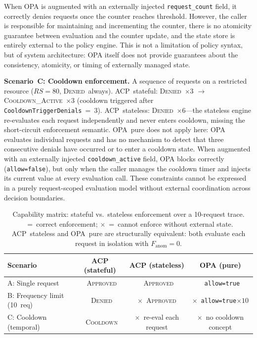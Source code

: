 \documentclass[11pt]{article}
\theoremstyle{definition}
\newcommand{\yes}{\checkmark}
\newcommand{\no}{$\times$}
\begin{document}
When OPA is augmented with an externally injected \texttt{request\_count} field,
it correctly denies requests once the counter reaches threshold.
However, the caller is responsible for maintaining and incrementing the counter,
there is no atomicity guarantee between evaluation and the counter update, and
the state store is entirely external to the policy engine.
This is not a limitation of policy syntax, but of system architecture: OPA itself does
not provide guarantees about the consistency, atomicity, or timing of externally
managed state.

\textbf{Scenario~C: Cooldown enforcement.}
A sequence of requests on a restricted resource ($RS=80$, \textsc{Denied}~always).
ACP~stateful: \textsc{Denied}~$\times 3$ $\to$ \textsc{Cooldown\_Active}~$\times 3$
(cooldown triggered after \texttt{CooldownTriggerDenials}~=~3).
ACP~stateless: \textsc{Denied}~$\times 6$---the stateless engine re-evaluates each
request independently and never enters cooldown, missing the short-circuit
enforcement semantic.
OPA~pure does not apply here: OPA evaluates individual requests and has no mechanism
to detect that three consecutive denials have occurred or to enter a cooldown state.
When augmented with an externally injected \texttt{cooldown\_active} field, OPA blocks
correctly (\texttt{allow=false}), but only when the caller manages the cooldown timer
and injects its current value at every evaluation call.
These constraints cannot be expressed in a purely request-scoped evaluation model
without external coordination across decision boundaries.

\begin{table}[h]
\centering
\small
\begin{tabular}{@{}lccc@{}}
\toprule
\textbf{Scenario} & \textbf{ACP (stateful)} & \textbf{ACP (stateless)} & \textbf{OPA (pure)} \\
\midrule
A: Single request           & \yes~\textsc{Approved}  & \yes~\textsc{Approved}    & \yes~\texttt{allow=true} \\
B: Frequency limit (10~req) & \yes~\textsc{Denied}    & \no~\textsc{Approved}     & \no~\texttt{allow=true}$\times 10$  \\
C: Cooldown (temporal)      & \yes~\textsc{Cooldown}  & \no~re-eval each request  & \no~no cooldown concept \\
\bottomrule
\end{tabular}
\caption{Capability matrix: stateful vs.\ stateless enforcement over a 10-request trace.
\yes~=~correct enforcement; \no~=~cannot enforce without external state.
ACP~stateless and OPA~pure are structurally equivalent: both evaluate each request
in isolation with $F_{\mathrm{anom}}=0$.}
\label{tab:exp14}
\end{table}
\end{document}

